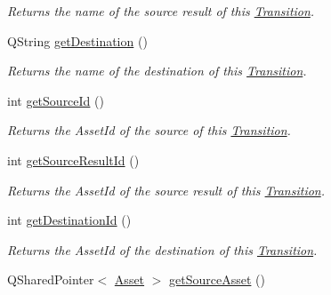 \begin{DoxyCompactItemize}
\begin{DoxyCompactList}\small\item\em Returns the name of the source result of this \hyperlink{class_picto_1_1_transition}{Transition}. \end{DoxyCompactList}\item 
\hypertarget{class_picto_1_1_transition_a1c334051eda2a89df23bc8216d765c4d}{Q\-String \hyperlink{class_picto_1_1_transition_a1c334051eda2a89df23bc8216d765c4d}{get\-Destination} ()}\label{class_picto_1_1_transition_a1c334051eda2a89df23bc8216d765c4d}

\begin{DoxyCompactList}\small\item\em Returns the name of the destination of this \hyperlink{class_picto_1_1_transition}{Transition}. \end{DoxyCompactList}\item 
\hypertarget{class_picto_1_1_transition_a4d42ee61e7b2251625d57b06e8d56e2e}{int \hyperlink{class_picto_1_1_transition_a4d42ee61e7b2251625d57b06e8d56e2e}{get\-Source\-Id} ()}\label{class_picto_1_1_transition_a4d42ee61e7b2251625d57b06e8d56e2e}

\begin{DoxyCompactList}\small\item\em Returns the Asset\-Id of the source of this \hyperlink{class_picto_1_1_transition}{Transition}. \end{DoxyCompactList}\item 
\hypertarget{class_picto_1_1_transition_a01a57352e32aef5196f199949e16e981}{int \hyperlink{class_picto_1_1_transition_a01a57352e32aef5196f199949e16e981}{get\-Source\-Result\-Id} ()}\label{class_picto_1_1_transition_a01a57352e32aef5196f199949e16e981}

\begin{DoxyCompactList}\small\item\em Returns the Asset\-Id of the source result of this \hyperlink{class_picto_1_1_transition}{Transition}. \end{DoxyCompactList}\item 
\hypertarget{class_picto_1_1_transition_a5524c92b8586830b43576d7eb29362c9}{int \hyperlink{class_picto_1_1_transition_a5524c92b8586830b43576d7eb29362c9}{get\-Destination\-Id} ()}\label{class_picto_1_1_transition_a5524c92b8586830b43576d7eb29362c9}

\begin{DoxyCompactList}\small\item\em Returns the Asset\-Id of the destination of this \hyperlink{class_picto_1_1_transition}{Transition}. \end{DoxyCompactList}\item 
\hypertarget{class_picto_1_1_transition_ae66744fa5235fb1218c12fd749ba8031}{Q\-Shared\-Pointer$<$ \hyperlink{class_picto_1_1_asset}{Asset} $>$ \hyperlink{class_picto_1_1_transition_ae66744fa5235fb1218c12fd749ba8031}{get\-Source\-Asset} ()}\label{class_picto_1_1_transition_ae66744fa5235fb1218c12fd749ba8031}


\end{DoxyCompactItemize}
